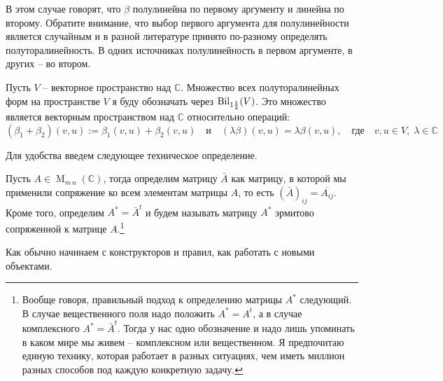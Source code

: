 В этом случае говорят, что $\beta$ полулинейна по первому аргументу и линейна по второму. Обратите внимание, что выбор первого аргумента для полулинейности является случайным и в разной литературе принято по-разному определять полуторалинейность. В одних источниках полулинейность в первом аргументе, в других -- во втором.

\begin{definition}
Пусть $V$ -- векторное пространство над $\mathbb C$. Множество всех полуторалинейных форм на пространстве $V$ я буду обозначать через $\operatorname{Bil}_{1\frac{1}{2}}(V)$. Это множество является векторным пространством над $\mathbb C$ относительно операций:
\[
(\beta_1+\beta_2)(v, u) := \beta_1(v,u) + \beta_2(v,u)\quad\text{и}\quad (\lambda\beta)(v,u) = \lambda\beta(v,u),\quad\text{где}\quad v,u\in V,\;\lambda\in \mathbb C
\]
\end{definition}

Для удобства введем следующее техническое определение.
\begin{definition}
Пусть $A\in \operatorname{M}_{m\,n}(\mathbb C)$, тогда определим матрицу $\bar A$ как матрицу, в которой мы применили сопряжение ко всем элементам матрицы $A$, то есть $(\bar A)_{ij} = \overline{A_{ij}}$. Кроме того, определим $A^* = \bar A^t$ и будем называть матрицу $A^*$ эрмитово сопряженной к матрице $A$.\footnote{Вообще говоря, правильный подход к определению матрицы $A^*$ следующий. В случае вещественного поля надо положить $A^* = A^t$, а в случае комплексного $A^* = \bar A^t$. Тогда у нас одно обозначение и надо лишь упоминать в каком мире мы живем -- комплексном или вещественном. Я предпочитаю единую технику, которая работает в разных ситуациях, чем иметь миллион разных способов под каждую конкретную задачу.}
\end{definition}

Как обычно начинаем с конструкторов и правил, как работать с новыми объектами.

